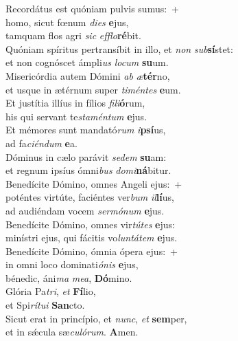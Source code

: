 \evenverse Recordátus est quóniam pulvis sumus:~+\\\evenverse  homo, sicut fœnum \textit{di}\textit{es} \textbf{e}jus,~\*\\
\evenverse tamquam flos agri \textit{sic} \textit{ef}\textit{flo}\textbf{ré}bit.\\
\oddverse Quóniam spíritus pertransíbit in illo, et \textit{non} \textit{sub}\textbf{sí}stet:~\*\\
\oddverse et non cognóscet ámpli\textit{us} \textit{lo}\textit{cum} \textbf{su}um.\\
\evenverse Misericórdia autem Dómini \textit{ab} \textit{æ}\textbf{tér}no,~\*\\
\evenverse et usque in ætérnum super \textit{ti}\textit{mén}\textit{tes} \textbf{e}um.\\
\oddverse Et justítia illíus in fílios \textit{fi}\textit{li}\textbf{ó}rum,~\*\\
\oddverse his qui servant te\textit{sta}\textit{mén}\textit{tum} \textbf{e}jus.\\
\evenverse Et mémores sunt mandató\textit{rum} \textit{i}\textbf{psí}us,~\*\\
\evenverse ad fa\textit{ci}\textit{én}\textit{dum} \textbf{e}a.\\
\oddverse Dóminus in cælo parávit \textit{se}\textit{dem} \textbf{su}am:~\*\\
\oddverse et regnum ipsíus ómni\textit{bus} \textit{do}\textit{mi}\textbf{ná}bitur.\\
\evenverse Benedícite Dómino, omnes Angeli ejus:~+\\
\evenverse  poténtes virtúte, faciéntes ver\textit{bum} \textit{il}\textbf{lí}us,~\*\\
\evenverse ad audiéndam vocem \textit{ser}\textit{mó}\textit{num} \textbf{e}jus.\\
\oddverse Benedícite Dómino, omnes vir\textit{tú}\textit{tes} \textbf{e}jus:~\*\\
\oddverse minístri ejus, qui fácitis vo\textit{lun}\textit{tá}\textit{tem} \textbf{e}jus.\\
\evenverse Benedícite Dómino, ómnia ópera ejus:~+\\
\evenverse  in omni loco dominati\textit{ó}\textit{nis} \textbf{e}jus,~\*\\
\evenverse bénedic, áni\textit{ma} \textit{me}\textit{a}, \textbf{Dó}mino.\\
\oddverse Glória Pa\textit{tri}, \textit{et} \textbf{Fí}lio,~\*\\
\oddverse et Spi\textit{rí}\textit{tu}\textit{i} \textbf{San}cto.\\
\evenverse Sicut erat in princípio, et \textit{nunc}, \textit{et} \textbf{sem}per,~\*\\
\evenverse et in sǽcula sæ\textit{cu}\textit{ló}\textit{rum}. \textbf{A}men.\\
